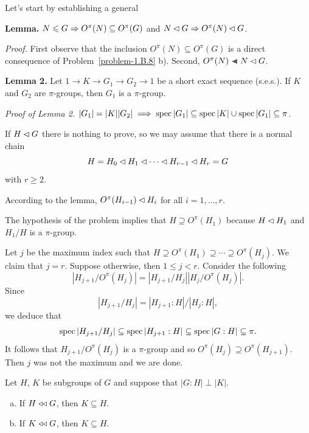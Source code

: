 \begin{solution} Let's start by establishing a general

\textbf{Lemma.} $N\leqslant G \Rightarrow O^\pi(N)\subseteq O^\pi(G)$ and $N\lhd G \Rightarrow O^\pi(N)\lhd G$.

\textit{Proof.} First observe that the inclusion $O^\pi(N)\subseteq O^\pi(G)$ is a direct consequence of Problem~\ref{problem-1.B.8} b). Second, $O^\pi(N)\ch N\normal G$.

    \textbf{Lemma 2.} Let $1\to K\to G_1\to G_2\to 1$ be a short exact sequence (s.e.s.). If $K$ and $G_2$ are $\pi$-groups, then $G_1$ is a $\pi$-group.
    
    \textit{Proof of\/ \upshape Lemma 2.} $|G_1|=|K||G_2|\implies \operatorname{spec}|G_1|\subseteq\operatorname{spec}|K|\cup\operatorname{spec}|G_1|\subseteq\pi$.
\fi

\medskip

If $H\lhd G$ there is nothing to prove, so we may assume that there is a normal chain
$$
    H = H_0\lhd H_1\lhd\cdots\lhd H_{r-1}\lhd H_r=G
$$
with $r\ge2$.

According to the lemma, $O^\pi(H_{i-1})\lhd H_i$ for all $i=1,\dots,r$. 

The hypothesis of the problem implies that $H\supseteq O^\pi(H_1)$ because $H\lhd H_1$ and $H_1/H$ is a $\pi$-group.

Let $j$ be the maximum index such that $H\supseteq O^\pi(H_1)\supseteq\cdots\supseteq O^\pi(H_j)$. We claim that $j=r$. Suppose otherwise, then $1\le j<r$. Consider the following
$$
    |H_{j+1}/O^\pi(H_j)|=|H_{j+1}/H_j||H_j/O^\pi(H_j)|.
$$
Since
$$
    |H_{j+1}/H_j| = |H_{j+1}:H|/|H_j:H|,
$$
we deduce that
$$
    \operatorname{spec}|H_{j+1}/H_j| \subseteq\operatorname{spec}|H_{j+1}:H|
        \subseteq\operatorname{spec}|G:H|\subseteq\pi.
$$
It follows that $H_{j+1}/O^\pi(H_j)$ is a $\pi$-group and so $O^\pi(H_j)\supseteq O^\pi(H_{j+1})$. Then $j$ was not the maximum and we are done.  \end{solution}


\begin{probl}\label{problem-2.A.3}
    Let\/ $H$, $K$ be subgroups of $G$ and suppose that $|G:H|\perp|K|$.
    \begin{enumerate}[a),font=\upshape]
    \item If $H \mathrel{\triangleleft\triangleleft} G$, then $K \subseteq H$.
    \item If $K \mathrel{\triangleleft\triangleleft} G$, then $K \subseteq H$.
    \end{enumerate}
\end{probl}

